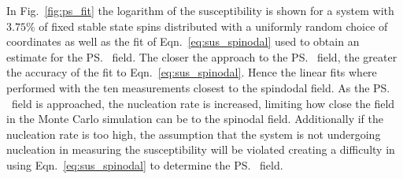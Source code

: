 In Fig.~\ref{fig:ps_fit} the logarithm of the susceptibility is shown for a system with $3.75\%$ of fixed stable state spins distributed with a uniformly random choice of coordinates as well as the fit of Eqn.~\eqref{eq:sus_spinodal} used to obtain an estimate for the \ps\ field. The closer the approach to the \ps\ field, the greater the accuracy of the fit to Eqn.~\eqref{eq:sus_spinodal}. Hence the linear fits where performed with   the ten measurements closest to the spindodal field. As the \ps\ field is approached, the nucleation rate is increased, limiting how close the field in the Monte Carlo simulation can be to the spinodal field. Additionally if the nucleation rate is too high, the assumption that the system is not undergoing nucleation in measuring the susceptibility will be violated creating a difficulty in using Eqn.~\eqref{eq:sus_spinodal} to determine the \ps\ field. 


